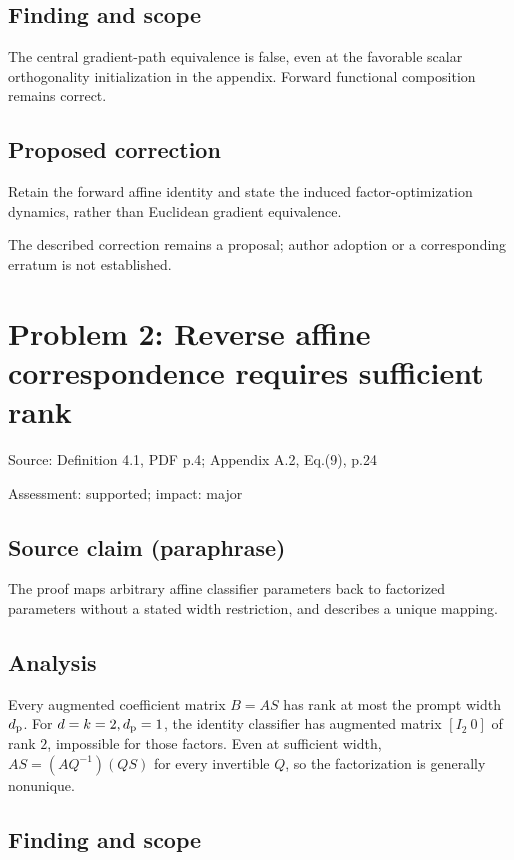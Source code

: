 \documentclass[11pt]{article}
\begin{document}
\subsection*{Finding and scope}

The central gradient-path equivalence is false, even at the favorable scalar orthogonality initialization in the appendix. Forward functional composition remains correct.

\subsection*{Proposed correction}

Retain the forward affine identity and state the induced factor-optimization dynamics, rather than Euclidean gradient equivalence.

The described correction remains a proposal; author adoption or a corresponding erratum is not established.

\section*{Problem 2: Reverse affine correspondence requires sufficient rank}

Source: Definition 4.1, PDF p.4; Appendix A.2, Eq.(9), p.24

Assessment: supported; impact: major

\subsection*{Source claim (paraphrase)}

The proof maps arbitrary affine classifier parameters back to factorized parameters without a stated width restriction, and describes a unique mapping.

\subsection*{Analysis}

Every augmented coefficient matrix \(B=AS\) has rank at most the prompt width \(d_{\rm p}\). For \(d=k=2,d_{\rm p}=1\), the identity classifier has augmented matrix \([I_2\ 0]\) of rank \(2\), impossible for those factors. Even at sufficient width, \(AS=(AQ^{-1})(QS)\) for every invertible \(Q\), so the factorization is generally nonunique.

\subsection*{Finding and scope}
\end{document}
